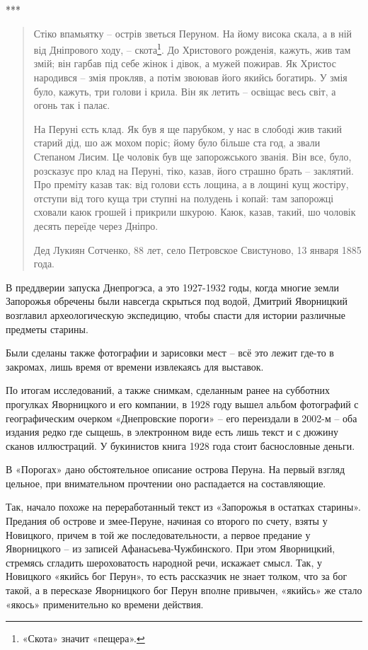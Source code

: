 \begin{center}
***\end{center}

\begin{quotation}
Стіко впамьятку – острів зветься Перуном. На йому висока скала, а в ній від Дніпрового ходу, – скота\footnote{«Скота» значит «пещера».}. До Христового рожденія, кажуть, жив там змій; він гарбав під себе жінок і дівок, а мужей пожирав. Як Христос народився – змія прокляв, а потім звоював його якийсь богатирь. У змія було, кажуть, три голови і крила. Він як летить – освіщає весь світ, а огонь так і палає.

На Перуні єсть клад. Як був я ще парубком, у нас в слободі жив такий старий дід, шо аж мохом поріс; йому було більше ста год, а звали Степаном Лисим. Це чоловік був ще запорожського званія. Він все, було, розсказує про клад на Перуні, тіко, казав, його страшно брать – заклятий. Про преміту казав так: від голови єсть лощина, а в лощині кущ жостіру, отступи від того куща три ступні на полудень і копай: там запорожці сховали каюк грошей і прикрили шкурою. Каюк, казав, такий, шо чоловік десять переїде через Дніпро.

Дед Лукиян Сотченко, 88 лет, село Петровское Свистуново, 13 января 1885 года.
\end{quotation}

В преддверии запуска Днепрогэса, а это 1927-1932 годы, когда многие земли Запорожья обречены были навсегда скрыться под водой, Дмитрий Яворницкий возглавил археологическую экспедицию, чтобы спасти для истории различные предметы старины. 

Были сделаны также фотографии и зарисовки мест – всё это лежит где-то в закромах, лишь время от времени извлекаясь для выставок. 

По итогам исследований, а также снимкам, сделанным ранее на субботних прогулках Яворницкого и его компании, в 1928 году вышел альбом фотографий с географическим очерком «Днепровские пороги» – его переиздали в 2002-м – оба издания редко где сыщешь, в электронном виде есть лишь текст и с дюжину сканов иллюстраций. У букинистов книга 1928 года стоит баснословные деньги.

В «Порогах» дано обстоятельное описание острова Перуна. На первый взгляд цельное, при внимательном прочтении оно распадается на составляющие. 

Так, начало похоже на переработанный текст из «Запорожья в остатках старины». Предания об острове и змее-Перуне, начиная со второго по счету, взяты у Новицкого, причем в той же последовательности, а первое предание у Яворницкого – из записей Афанасьева-Чужбинского. При этом Яворницкий, стремясь сгладить шероховатость народной речи, искажает смысл. Так, у Новицкого «якийсь бог Перун», то есть рассказчик не знает толком, что за бог такой, а в пересказе Яворницкого бог Перун вполне привычен, «якийсь» же стало «якось» применительно ко времени действия.

